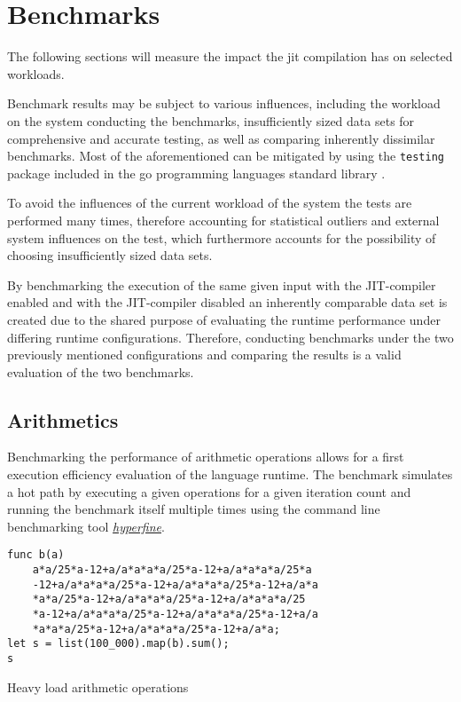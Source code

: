\chapter{Benchmarks}

The following sections will measure the impact the jit compilation has on
selected workloads.

Benchmark results may be subject to various influences, including the workload
on the system conducting the benchmarks, insufficiently sized data sets for
comprehensive and accurate testing, as well as comparing inherently dissimilar
benchmarks. Most of the aforementioned can be mitigated by using the
\texttt{testing} package included in the go programming languages standard
library \cite{go_testing}. 

To avoid the influences of the current workload of the system the tests are
performed many times, therefore accounting for statistical outliers and
external system influences on the test, which furthermore accounts for the
possibility of choosing insufficiently sized data sets.

By benchmarking the execution of the same given input with the JIT-compiler
enabled and with the JIT-compiler disabled an inherently comparable data set is
created due to the shared purpose of evaluating the runtime performance under
differing runtime configurations. Therefore, conducting benchmarks under the
two previously mentioned configurations and comparing the results is a valid
evaluation of the two benchmarks.

\section{Arithmetics}

Benchmarking the performance of arithmetic operations allows for a first
execution efficiency evaluation of the language runtime. The benchmark
simulates a hot path by executing a given operations for a given iteration
count and running the benchmark itself multiple times using the command line
benchmarking tool
\href{https://github.com/sharkdp/hyperfine}{\textit{hyperfine}}.

\begin{listing}[H]
    \begin{verbatim}
func b(a)
    a*a/25*a-12+a/a*a*a*a/25*a-12+a/a*a*a*a/25*a
    -12+a/a*a*a*a/25*a-12+a/a*a*a*a/25*a-12+a/a*a
    *a*a/25*a-12+a/a*a*a*a/25*a-12+a/a*a*a*a/25
    *a-12+a/a*a*a*a/25*a-12+a/a*a*a*a/25*a-12+a/a
    *a*a*a/25*a-12+a/a*a*a*a/25*a-12+a/a*a;
let s = list(100_000).map(b).sum();
s
    \end{verbatim}
    \caption{Heavy load arithmetic operations}
    \label{code:benchmark-arithmetics}
\end{listing}

